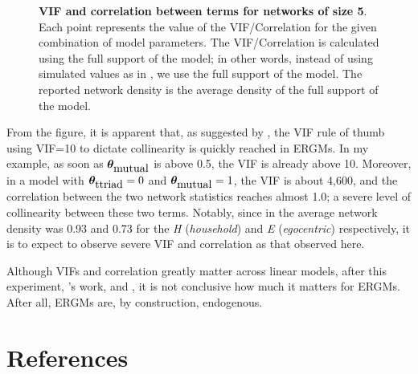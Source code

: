 \documentclass[12pt]{article}
\begin{document}
\begin{figure}
\begin{minipage}
  \end{minipage}
  \caption[]{\textbf{VIF and correlation between terms for networks of size 5}. Each point represents the value of the VIF/Correlation for the given combination of model parameters. The VIF/Correlation is calculated using the full support of the model; in other words, instead of using simulated values as in \cite{duxburyDiagnosingMulticollinearityExponential2021}, we use the full support of the model. The reported network density is the average density of the full support of the model.}
  \label{fig:vif-cor}
\end{figure}

From the figure, it is apparent that, as suggested by \citeauthor{duxburyDiagnosingMulticollinearityExponential2021}, the VIF rule of thumb using VIF=10 to dictate collinearity is quickly reached in ERGMs. In my example, as soon as $\bm{\theta}_{\mbox{mutual}}$ is above 0.5, the VIF is already above 10. Moreover, in a model with $\bm{\theta}_{\mbox{ttriad}} = 0$ and $\bm{\theta}_{\mbox{mutual}} = 1$, the VIF is about 4,600, and the correlation between the two network statistics reaches almost 1.0; a severe level of collinearity between these two terms. Notably, since in \cite{krivitskyTaleTwoDatasets2022} the average network density was 0.93 and 0.73 for the \textit{H} (\textit{household}) and \textit{E} (\textit{egocentric}) respectively, it is to expect to observe severe VIF and correlation as that observed here.

Although VIFs and correlation greatly matter across linear models, after this experiment, \citeauthor*{duxburyDiagnosingMulticollinearityExponential2021}'s work, and \citeauthor*{krivitskyTaleTwoDatasets2022}, it is not conclusive how much it matters for ERGMs. After all, ERGMs are, by construction, endogenous.


\section{References}




 






\end{document}
